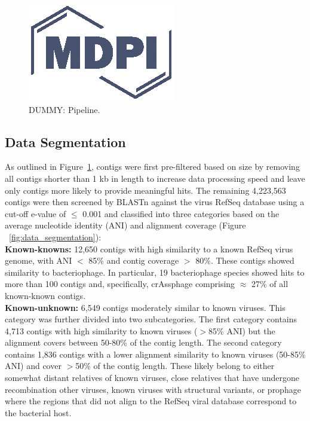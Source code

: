   \begin{figure}[h]
    \centering
    \includegraphics{Definitions/logo-mdpi}
    \caption{DUMMY: Pipeline.
            \label{fig:data_selection_pipeline}}
  \end{figure}

  \subsection{Data Segmentation}
  As outlined in Figure~\ref{fig:data_selection_pipeline}, contigs were first
  pre-filtered based on size by removing all contigs shorter than 1 kb in
  length to increase data processing speed and leave only contigs more likely
  to provide meaningful hits. The remaining 4,223,563 contigs were then
  screened by BLASTn \cite{Camacho2009} against the virus RefSeq database
  \cite{Brister2015} using a cut-off e-value of $\leq$ 0.001 and classified into
  three categories based on the average nucleotide identity (ANI) and alignment
  coverage (Figure ~\ref{fig:data_segmentation}):\\

    \textbf{Known-knowns:} 12,650 contigs with high similarity to a known RefSeq
    virus genome, with ANI $<$ 85\% and contig coverage $>$ 80\%. These contigs
    showed similarity to bacteriophage. In particular, 19 bacteriophage species
    showed hits to more than 100 contigs and, specifically, crAssphage
    comprising $\approx$ 27\% of all known-known contigs.\\

    \textbf{Known-unknown:} 6,549 contigs moderately similar to known viruses.
    This category was further divided into two subcategories. The first
    category contains 4,713 contigs with high similarity to known viruses
    ($>$85\% ANI) but the alignment covers between 50-80\% of the contig
    length. The second category contains  1,836 contigs with a  lower alignment
    similarity to known viruses (50-85\% ANI) and cover $>$50\% of the contig
    length. These likely belong to either somewhat distant relatives of known
    viruses, close relatives that have undergone recombination other viruses,
    known viruses with structural variants, or prophage where the regions that
    did not align to the RefSeq viral database correspond to the bacterial
    host.\\

